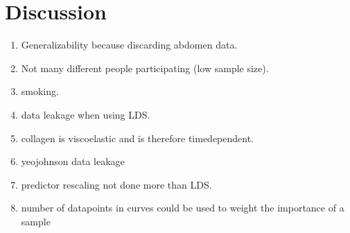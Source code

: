 \chapter{Discussion}

\begin{enumerate}
    \item Generalizability because discarding abdomen data.
    \item Not many different people participating (low sample size).
    \item smoking.
    \item data leakage when using LDS.
    \item collagen is viscoelastic and is therefore timedependent.
    \item yeojohnson data leakage
    \item predictor rescaling not done more than LDS.
    \item number of datapoints in curves could be used to weight the importance of a sample
\end{enumerate}